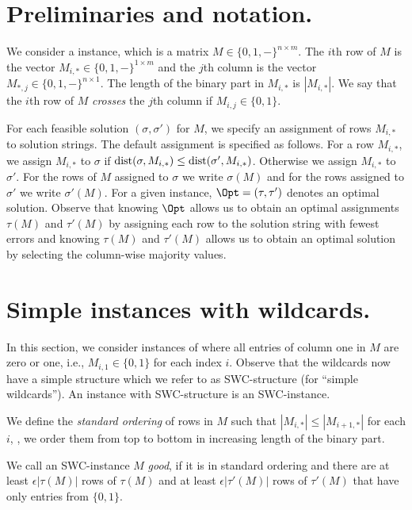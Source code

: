 \section{Preliminaries and notation.}\label{sec:prelim}

We consider a \GMEC instance, which is a matrix $M \in \{0,1, -\}^{n \times m}$.
The $i$th row of $M$ is the vector $M_{i,*} \in \{0,1, -\}^{1 \times m}$ and the $j$th column is the vector $M_{*,j} \in \{0,1, -\}^{n \times 1}$.
The length of the binary part in $M_{i,*}$ is $|M_{i,*}|$. 
We say that the $i$th row of $M$ \emph{crosses} the $j$th column if $M_{i,j} \in \{0,1\}$.

For each feasible solution $(\sigma,\sigma')$ for $M$, we specify an assignment of rows $M_{i,*}$ to solution strings.
The default assignment is specified as follows.
For a row $M_{i,*}$, we assign $M_{i,*}$ to $\sigma$ if $\mathrm{dist}(\sigma,M_{i,*}) \le \mathrm{dist}(\sigma',M_{i,*})$.
Otherwise we assign $M_{i,*}$ to $\sigma'$.
For the rows of $M$ assigned to $\sigma$ we write $\sigma(M)$ and for the rows assigned to $\sigma'$ we write $\sigma'(M)$.
For a given instance, $\Opt = (\tau, \tau')$ denotes an optimal solution.
Observe that knowing $\Opt$ allows us to obtain an optimal assignments $\tau(M)$ and $\tau'(M)$ by assigning each row to the solution string with fewest errors and knowing $\tau(M)$ and $\tau'(M)$ allows us to obtain an optimal solution by selecting the column-wise majority values.

\section{Simple instances with wildcards.}\label{sec:swc}
In this section, we consider instances of \GMEC where all entries of column one in $M$ are zero or one, i.e., $M_{i,1} \in \{0,1\}$ for each index $i$.
Observe that the wildcards now have a simple structure which we refer to as SWC-structure (for ``simple wildcards'').
An instance with SWC-structure is an SWC-instance.

\begin{definition}
    We define the \emph{standard ordering} of rows in $M$ such that $|M_{i,*}| \le |M_{i+1,*}|$ for each $i$, \ie, we order them from top to bottom in increasing length of the binary part. 
    \label{def:order-SWC}
\end{definition}

\begin{definition}
    \label{def:good-SWC}
    We call an SWC-instance $M$ \emph{good}, if it is in standard ordering and there are at least $\epsilon |\tau(M)|$ rows of $\tau(M)$ and at least $\epsilon |\tau'(M)|$ rows of $\tau'(M)$ that have only entries from $\{0,1\}$.
\end{definition}


